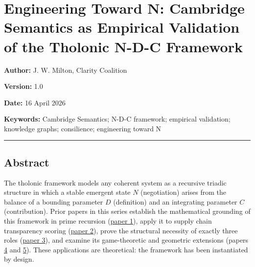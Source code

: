 \documentclass[
  11pt,
  letterpaper,
]{article}
\author{}
\date{}
\begin{document}
\section{Engineering Toward N: Cambridge Semantics as Empirical
Validation of the Tholonic N-D-C
Framework}\label{engineering-toward-n-cambridge-semantics-as-empirical-validation-of-the-tholonic-n-d-c-framework}

\textbf{Author:} J. W. Milton, Clarity Coalition

\textbf{Version:} 1.0

\textbf{Date:} 16 April 2026

\textbf{Keywords:} Cambridge Semantics; N-D-C framework; empirical
validation; knowledge graphs; consilience; engineering toward N

\begin{center}\rule{0.5\linewidth}{0.5pt}\end{center}

\subsection{Abstract}\label{abstract}

The tholonic framework models any coherent system as a recursive triadic
structure in which a stable emergent state \(N\) (negotiation) arises
from the balance of a bounding parameter \(D\) (definition) and an
integrating parameter \(C\) (contribution). Prior papers in this series
establish the mathematical grounding of this framework in prime
recursion
(\href{https://github.com/baardev/truevalue/blob/main/docnav/Research/papers/1_recursive-tholonic-five-constants/1_recursive-tholonic-five-constants.pdf}{paper
1}), apply it to supply chain transparency scoring
(\href{https://github.com/baardev/truevalue/blob/main/docnav/Research/papers/2_supply-chain-transparency-tvpci/2_supply-chain-transparency-tvpci.pdf}{paper
2}), prove the structural necessity of exactly three roles
(\href{https://github.com/baardev/truevalue/blob/main/docnav/Research/papers/3_minimal-recursive-triadic-framework/3_minimal-recursive-triadic-framework.pdf}{paper
3}), and examine its game-theoretic and geometric extensions (papers
\href{https://github.com/baardev/truevalue/blob/main/docnav/Research/papers/4_game-theoretic-triadic-balance/4_game-theoretic-triadic-balance.pdf}{4}
and
\href{https://github.com/baardev/truevalue/blob/main/docnav/Research/papers/5_tholonic-twistor-connection/5_tholonic-twistor-connection.pdf}{5}).
These applications are theoretical: the framework has been instantiated
by design.
\end{document}
